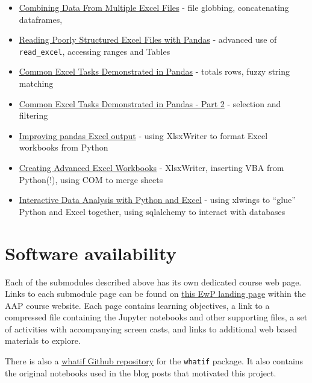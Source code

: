 \documentclass[ited,blindrev]{informs3}              %
\newcommand{\code}[1]{\texttt{#1}}
\begin{document}
\begin{itemize}
	\item
	\href{https://pbpython.com/excel-file-combine.html}{Combining Data
		From Multiple Excel Files} - file globbing, concatenating dataframes,
	\item
	\href{https://pbpython.com/pandas-excel-range.html}{Reading Poorly
		Structured Excel Files with Pandas} - advanced use of
	\texttt{read\_excel}, accessing ranges and Tables
	\item
	\href{https://pbpython.com/excel-pandas-comp.html}{Common Excel Tasks
		Demonstrated in Pandas} - totals rows, fuzzy string matching
	\item
	\href{https://pbpython.com/excel-pandas-comp-2.html}{Common Excel
		Tasks Demonstrated in Pandas - Part 2} - selection and filtering
	\item
	\href{https://pbpython.com/improve-pandas-excel-output.html}{Improving
		pandas Excel output} - using XlsxWriter to format Excel workbooks from
	Python
	\item
	\href{https://pbpython.com/advanced-excel-workbooks.html}{Creating
		Advanced Excel Workbooks} - XlsxWriter, inserting VBA from Python(!),
	using COM to merge sheets
	\item
	\href{https://pbpython.com/xlwings-pandas-excel.html}{Interactive Data
		Analysis with Python and Excel} - using xlwings to ``glue'' Python and
	Excel together, using sqlalchemy to interact with databases
\end{itemize}


\section{Software availability}

Each of the submodules described above has its own dedicated course web page. Links to each submodule page can be found on \href{http://www.sba.oakland.edu/faculty/isken/courses/mis6900/mod3_excel_with_python.html}{this EwP landing page} within the AAP course website. Each page contains learning objectives, a link to a compressed file containing the Jupyter notebooks and other supporting files, a set of activities with accompanying screen casts, and links to additional web based materials to explore.

There is also a \href{https://github.com/misken/whatif}{whatif Github repository} for the \code{whatif} package. It also contains the original notebooks used in the blog posts that motivated this project.
\end{document}
